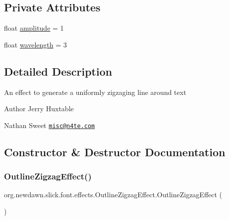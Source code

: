 \subsection*{Private Attributes}
\begin{DoxyCompactItemize}
\item 
float \mbox{\hyperlink{classorg_1_1newdawn_1_1slick_1_1font_1_1effects_1_1_outline_zigzag_effect_a26543e6243bf5e4fb7486d7a7674ed1c}{amplitude}} = 1
\item 
float \mbox{\hyperlink{classorg_1_1newdawn_1_1slick_1_1font_1_1effects_1_1_outline_zigzag_effect_a4393ec4437b469ea2855c70deec82d09}{wavelength}} = 3
\end{DoxyCompactItemize}


\subsection{Detailed Description}
An effect to generate a uniformly zigzaging line around text

\begin{DoxyAuthor}{Author}
Jerry Huxtable 

Nathan Sweet \href{mailto:misc@n4te.com}{\tt misc@n4te.\+com} 
\end{DoxyAuthor}


\subsection{Constructor \& Destructor Documentation}
\mbox{\label{classorg_1_1newdawn_1_1slick_1_1font_1_1effects_1_1_outline_zigzag_effect_a993189ce1633590fddaf5fae5d5d8b50}} 
\subsubsection{\texorpdfstring{Outline\+Zigzag\+Effect()}{OutlineZigzagEffect()}\hspace{0.1cm}{\footnotesize\ttfamily [1/2]}}
{\footnotesize\ttfamily org.\+newdawn.\+slick.\+font.\+effects.\+Outline\+Zigzag\+Effect.\+Outline\+Zigzag\+Effect (\begin{DoxyParamCaption}{ }\end{DoxyParamCaption})\hspace{0.3cm}{\ttfamily [inline]}}

